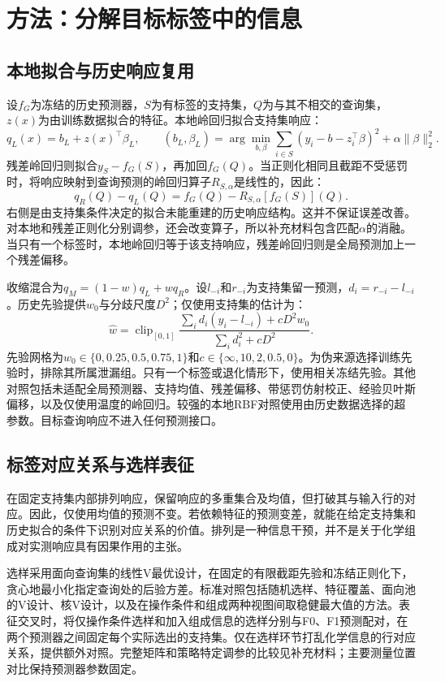 \documentclass[11pt]{article}
\begin{document}
\section{方法：分解目标标签中的信息}
\subsection{本地拟合与历史响应复用}
设$f_G$为冻结的历史预测器，$S$为有标签的支持集，$Q$为与其不相交的查询集，$z(x)$为由训练数据拟合的特征。本地岭回归拟合支持集响应：
\begin{equation}
q_L(x)=b_L+z(x)^\top\beta_L,\qquad
(b_L,\beta_L)=\arg\min_{b,\beta}\sum_{i\in S}(y_i-b-z_i^\top\beta)^2+\alpha\|\beta\|_2^2.
\end{equation}
残差岭回归则拟合$y_S-f_G(S)$，再加回$f_G(Q)$。当正则化相同且截距不受惩罚时，将响应映射到查询预测的岭回归算子$R_{S,\alpha}$是线性的，因此：
\begin{equation}\label{eq:projection}
q_R(Q)-q_L(Q)=f_G(Q)-R_{S,\alpha}[f_G(S)](Q).
\end{equation}
右侧是由支持集条件决定的拟合未能重建的历史响应结构。这并不保证误差改善。对本地和残差正则化分别调参，还会改变算子，所以补充材料包含匹配$\alpha$的消融。当只有一个标签时，本地岭回归等于该支持响应，残差岭回归则是全局预测加上一个残差偏移。

收缩混合为$q_M=(1-w)q_L+wq_R$。设$l_{-i}$和$r_{-i}$为支持集留一预测，$d_i=r_{-i}-l_{-i}$。历史先验提供$w_0$与分歧尺度$D^2$；仅使用支持集的估计为：
\begin{equation}\label{eq:blend}
\widehat w=\operatorname{clip}_{[0,1]}
\frac{\sum_i d_i(y_i-l_{-i})+cD^2w_0}{\sum_i d_i^2+cD^2}.
\end{equation}
先验网格为$w_0\in\{0,0.25,0.5,0.75,1\}$和$c\in\{\infty,10,2,0.5,0\}$。为伪来源选择训练先验时，排除其所属泄漏组。只有一个标签或退化情形下，使用相关冻结先验。其他对照包括未适配全局预测器、支持均值、残差偏移、带惩罚仿射校正、经验贝叶斯偏移，以及仅使用温度的岭回归。较强的本地RBF对照使用由历史数据选择的超参数。目标查询响应不进入任何预测接口。

\subsection{标签对应关系与选样表征}
在固定支持集内部排列响应，保留响应的多重集合及均值，但打破其与输入行的对应。因此，仅使用均值的预测不变。若依赖特征的预测变差，就能在给定支持集和历史拟合的条件下识别对应关系的价值。排列是一种信息干预，并不是关于化学组成对实测响应具有因果作用的主张。

选样采用面向查询集的线性V最优设计，在固定的有限截距先验和冻结正则化下，贪心地最小化指定查询处的后验方差。标准对照包括随机选样、特征覆盖、面向池的V设计、核V设计，以及在操作条件和组成两种视图间取稳健最大值的方法。表征交叉时，将仅操作条件选样和加入组成信息的选样分别与F0、F1预测配对，在两个预测器之间固定每个实际选出的支持集。仅在选样环节打乱化学信息的行对应关系，提供额外对照。完整矩阵和策略特定调参的比较见补充材料；主要测量位置对比保持预测器参数固定。
\end{document}
